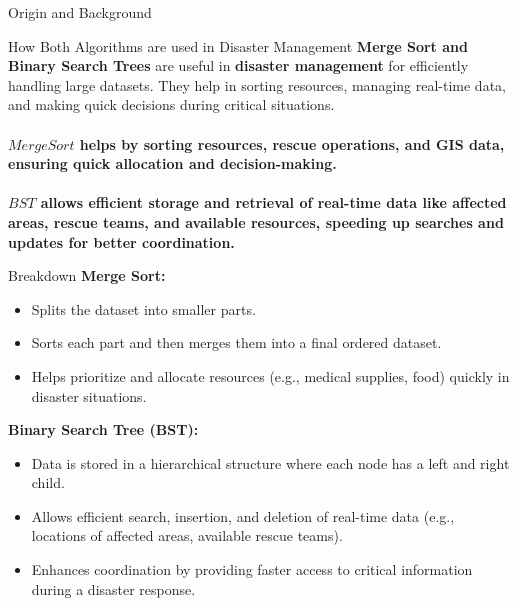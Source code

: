 \documentclass[final]{beamer}
\newlength{\colwidth}
\begin{document}
\begin{frame}[t]
\begin{columns}[t]
\begin{column}{\colwidth}
\begin{block}{Origin and Background}
    			\end{block}
                \begin{block}{How Both Algorithms are used in Disaster Management}
                    \justifying
                    \textbf{Merge Sort and Binary Search Trees}  are useful in \textbf{disaster management} for efficiently handling large datasets. They help in sorting resources, managing real-time data, and making quick decisions during critical situations.
                    \phantom{This text will be invisible}\\
                    \phantom{This text will be invisible}\\
                    \textbf{\textbf{$Merge Sort$} helps by sorting resources, rescue operations, and GIS data, ensuring quick allocation and decision-making.}
                    \phantom{This text will be invisible}\\
                     \phantom{This text will be invisible}\\
                    \textbf{$BST$ allows efficient storage and retrieval of real-time data like affected areas, rescue teams, and available resources, speeding up searches and updates for better coordination.}
                    \phantom{This text will be invisible}\\
                
                   

                \end{block}
    			\begin{block}{Breakdown}
                    \justifying
                    \textbf{Merge Sort:}
\begin{itemize}
    \item Splits the dataset into smaller parts.
    \item Sorts each part and then merges them into a final ordered dataset.
    \item Helps prioritize and allocate resources (e.g., medical supplies, food) quickly in disaster situations.
\end{itemize}

\textbf{Binary Search Tree (BST):}
\begin{itemize}
    \item Data is stored in a hierarchical structure where each node has a left and right child.
    \item Allows efficient search, insertion, and deletion of real-time data (e.g., locations of affected areas, available rescue teams).
    \item Enhances coordination by providing faster access to critical information during a disaster response.
\end{itemize}


\end{block}
\end{column}
\end{columns}
\end{frame}
\end{document}

